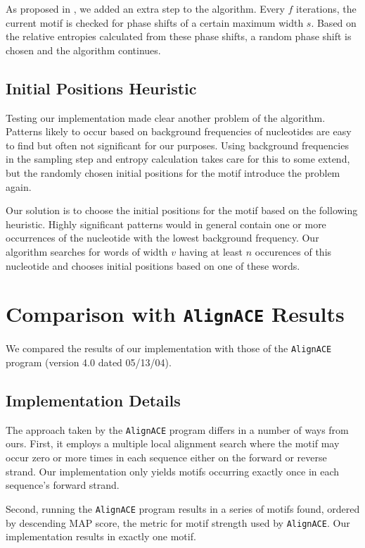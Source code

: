 \documentclass[a4paper,11pt]{article}
\begin{document}
As proposed in \cite{Lawrence93}, we added an extra step to the algorithm.
Every $f$ iterations, the current motif is checked for phase shifts of a
certain maximum width $s$. Based on the relative entropies calculated from
these phase shifts, a random phase shift is chosen and the algorithm
continues.


\subsection*{Initial Positions Heuristic}

Testing our implementation made clear another problem of the algorithm.
Patterns likely to occur based on background frequencies of nucleotides are
easy to find but often not significant for our purposes. Using background
frequencies in the sampling step and entropy calculation takes care for this
to some extend, but the randomly chosen initial positions for the motif
introduce the problem again.

Our solution is to choose the initial positions for the motif based on the
following heuristic. Highly significant patterns would in general contain one
or more occurrences of the nucleotide with the lowest background frequency.
Our algorithm searches for words of width $v$ having at least $n$ occurences
of this nucleotide and chooses initial positions based on one of these words.


\section{Comparison with \texttt{AlignACE} Results}

We compared the results of our implementation with those of the
\texttt{AlignACE} program \cite{AlignACE} (version 4.0 dated 05/13/04).


\subsection*{Implementation Details}

The approach taken by the \texttt{AlignACE} program differs in a number of
ways from ours. First, it employs a multiple local alignment search where
the motif may occur zero or more times in each sequence either on the forward
or reverse strand. Our implementation only yields motifs occurring exactly
once in each sequence's forward strand.

Second, running the \texttt{AlignACE} program results in a series of motifs
found, ordered by descending MAP score, the metric for motif strength used by
\texttt{AlignACE}. Our implementation results in exactly one motif.
\end{document}
